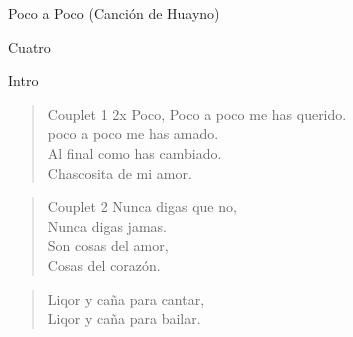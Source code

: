 \begin{song}[huayno]{Poco a Poco (Canción de Huayno)}

\begin{instrumental}{Cuatro}
\measure{}\measure{}\measure{}
\end{instrumental}

\begin{instrumental}{Intro}
\measure{}\measure{}\measure{}\measure{}
\measure{}\measure{}\measure{}\measure{}
\measure{}\measure{}\measure{}
\end{instrumental}

\begin{verse}{Couplet 1 2x}
Poco, Poco a poco me has querido.\\
poco a poco me has amado.\\
Al final como has cambiado.\\
Chascosita de mi amor.
\end{verse}

\begin{verse}{Couplet 2}
Nunca digas que no,\\
Nunca digas jamas.\\
Son cosas del amor,\\
Cosas del corazón.
\end{verse}

\begin{verse}{}
Liqor y caña para cantar,\\
Liqor y caña para bailar.
\end{verse}

\end{song}

